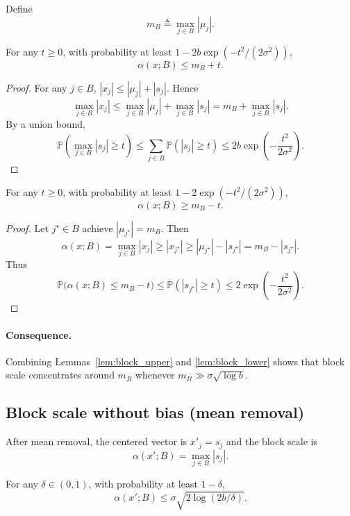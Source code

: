 Define
\[
m_B \triangleq \max_{j\in B} |\mu_j|.
\]

\begin{lemma}
\label{lem:block_upper}
For any $t\ge 0$, with probability at least $1-2b\exp(-t^2/(2\sigma^2))$,
\[
\alpha(x;B) \le m_B + t.
\]
\end{lemma}

\begin{proof}
For any $j\in B$, $|x_j| \le |\mu_j| + |s_j|$.
Hence
\[
\max_{j\in B}|x_j|
\le
\max_{j\in B}|\mu_j| + \max_{j\in B}|s_j|
=
m_B + \max_{j\in B}|s_j|.
\]
By a union bound,
\[
\mathbb{P}\left(\max_{j\in B}|s_j|\ge t\right)
\le
\sum_{j\in B}\mathbb{P}(|s_j|\ge t)
\le
2b\exp\!\left(-\frac{t^2}{2\sigma^2}\right).
\]
\end{proof}

\begin{lemma}
\label{lem:block_lower}
For any $t\ge 0$, with probability at least $1-2\exp(-t^2/(2\sigma^2))$,
\[
\alpha(x;B) \ge m_B - t.
\]
\end{lemma}

\begin{proof}
Let $j^\star\in B$ achieve $|\mu_{j^\star}|=m_B$.
Then
\[
\alpha(x;B)=\max_{j\in B}|x_j|\ge |x_{j^\star}|
\ge |\mu_{j^\star}| - |s_{j^\star}|
= m_B - |s_{j^\star}|.
\]
Thus
\[
\mathbb{P}\big(\alpha(x;B)\le m_B - t\big)
\le
\mathbb{P}(|s_{j^\star}|\ge t)
\le
2\exp\!\left(-\frac{t^2}{2\sigma^2}\right).
\]
\end{proof}

\paragraph{Consequence.}
Combining Lemmas~\ref{lem:block_upper} and \ref{lem:block_lower} shows that
block scale concentrates around $m_B$ whenever $m_B \gg \sigma\sqrt{\log b}$.

\subsection{Block scale without bias (mean removal)}

After mean removal, the centered vector is $x'_j = s_j$ and the block scale is
\[
\alpha(x';B) = \max_{j\in B}|s_j|.
\]

\begin{lemma}
\label{lem:centered_max}
For any $\delta\in(0,1)$, with probability at least $1-\delta$,
\[
\alpha(x';B) \le \sigma \sqrt{2\log(2b/\delta)}.
\]
\end{lemma}

